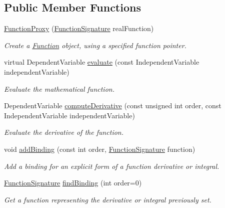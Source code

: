\subsection*{Public Member Functions}
\begin{DoxyCompactItemize}
\item 
\hyperlink{classtudat_1_1basic__mathematics_1_1FunctionProxy_a0a135b936dfe7b39852091286c02f79e}{Function\+Proxy} (\hyperlink{classtudat_1_1basic__mathematics_1_1FunctionProxy_a1861c20597dcc1cbce1e7c455f2d82a9}{Function\+Signature} real\+Function)
\begin{DoxyCompactList}\small\item\em Create a \hyperlink{classtudat_1_1basic__mathematics_1_1Function}{Function} object, using a specified function pointer. \end{DoxyCompactList}\item 
virtual Dependent\+Variable \hyperlink{classtudat_1_1basic__mathematics_1_1FunctionProxy_ab8ef1b8407695652bb20416bbbf5909c}{evaluate} (const Independent\+Variable independent\+Variable)
\begin{DoxyCompactList}\small\item\em Evaluate the mathematical function. \end{DoxyCompactList}\item 
Dependent\+Variable \hyperlink{classtudat_1_1basic__mathematics_1_1FunctionProxy_a5f79c3fef685b7b2eaaec22661680d61}{compute\+Derivative} (const unsigned int order, const Independent\+Variable independent\+Variable)
\begin{DoxyCompactList}\small\item\em Evaluate the derivative of the function. \end{DoxyCompactList}\item 
void \hyperlink{classtudat_1_1basic__mathematics_1_1FunctionProxy_a9480775191c8926a3877501680db11b3}{add\+Binding} (const int order, \hyperlink{classtudat_1_1basic__mathematics_1_1FunctionProxy_a1861c20597dcc1cbce1e7c455f2d82a9}{Function\+Signature} function)
\begin{DoxyCompactList}\small\item\em Add a binding for an explicit form of a function derivative or integral. \end{DoxyCompactList}\item 
\hyperlink{classtudat_1_1basic__mathematics_1_1FunctionProxy_a1861c20597dcc1cbce1e7c455f2d82a9}{Function\+Signature} \hyperlink{classtudat_1_1basic__mathematics_1_1FunctionProxy_aae18a04b79478c6318dd2b91c345f2f5}{find\+Binding} (int order=0)
\begin{DoxyCompactList}\small\item\em Get a function representing the derivative or integral previously set. \end{DoxyCompactList}\end{DoxyCompactItemize}
